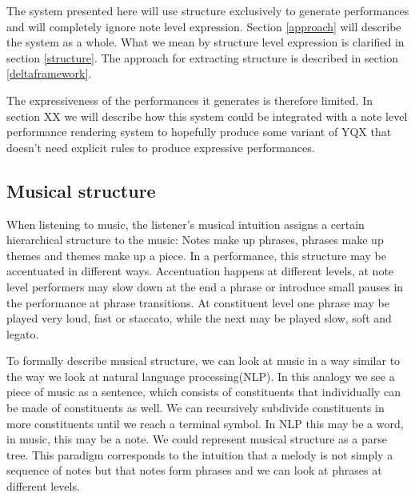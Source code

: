 \documentclass[a4paper,10pt]{article}
\begin{document}
The system presented here will use structure exclusively to generate performances and will completely ignore note level expression. Section \ref{approach} will describe the system as a whole. What we mean by structure level expression is clarified in section \ref{structure}. The approach for extracting structure is described in section \ref{deltaframework}.  

The expressiveness of the performances it generates is therefore limited. In section XX we will describe how this system could be integrated with a note level performance rendering system to hopefully produce some variant of YQX that doesn't need explicit rules to produce expressive performances.







\subsection{Musical structure}
When listening to music, the listener's musical intuition assigns a certain hierarchical structure to the music: Notes make up phrases, phrases make up themes and themes make up a piece. In a performance, this structure may be accentuated in different ways. Accentuation happens at different levels, at note level performers may slow down at the end a phrase or introduce small pauses in the performance at phrase transitions. At constituent level one phrase may be played very loud, fast or staccato, while the next may be played slow, soft and legato. 

To formally describe musical structure, we can look at music in a way similar to the way we look at natural language processing(NLP). In this analogy we see a piece of music as a sentence, which consists of constituents that individually can be made of constituents as well. We can recursively subdivide constituents in more constituents until we reach a terminal symbol. In NLP this may be a word, in music, this may be a note. We could represent musical structure as a parse tree. This paradigm corresponds to the intuition that a melody is not simply a sequence of notes but that notes form phrases and we can look at phrases at different levels. 
\end{document}
